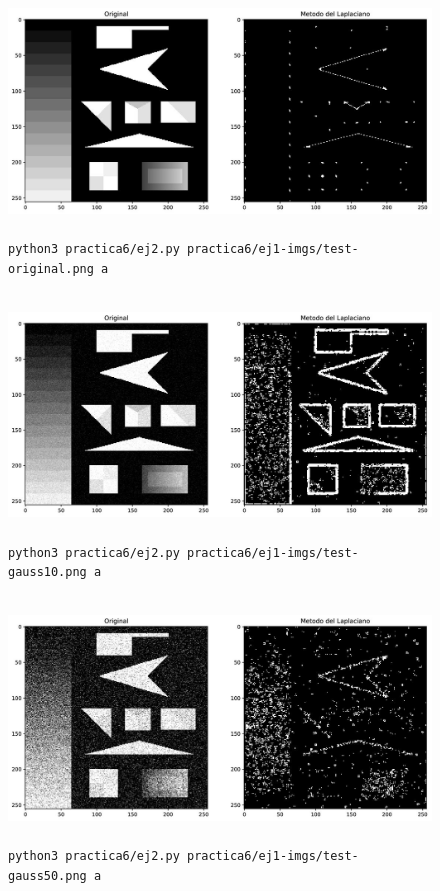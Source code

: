 \documentclass[11pt, spanish]{article}
\begin{document}
\begin{figure}[H]
\centering
    \includegraphics[height=6.5cm]{informe-imgs/ej2-a-test-original.jpg}
    \caption{\texttt{python3 practica6/ej2.py practica6/ej1-imgs/test-original.png a}}
\end{figure}

\begin{figure}[H]
\centering
    \includegraphics[height=6.5cm]{informe-imgs/ej2-a-test-gauss10.jpg}
    \caption{\texttt{python3 practica6/ej2.py practica6/ej1-imgs/test-gauss10.png a}}
\end{figure}

\begin{figure}[H]
\centering
    \includegraphics[height=6.5cm]{informe-imgs/ej2-a-test-gauss50.jpg}
    \caption{\texttt{python3 practica6/ej2.py practica6/ej1-imgs/test-gauss50.png a}}
\end{figure}
\end{document}

